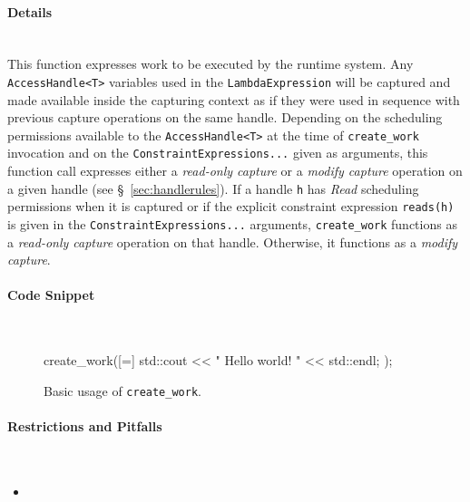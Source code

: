 \paragraph{Details}\mbox{}\\
This function expresses work to be executed by the runtime system.  Any
\texttt{AccessHandle<T>} variables used in the \texttt{LambdaExpression} will be
captured and made available inside the capturing context as if they were used in
sequence with previous capture operations on the same handle.  Depending on the
scheduling permissions available to the \texttt{AccessHandle<T>} at the time of
\texttt{create\_work} invocation and on the \texttt{ConstraintExpressions...}
given as arguments, this function call expresses either a {\it read-only
capture} or a {\it modify capture} operation on a given handle (see
\S~\ref{sec:handlerules}).  If a handle \texttt{h} has {\it Read} scheduling
permissions when it is captured or if the explicit constraint expression
\texttt{reads(h)} is given in the \texttt{ConstraintExpressions...} arguments,
\texttt{create\_work} functions as a {\it read-only capture} operation on that handle.
Otherwise, it functions as a {\it modify capture}.  


\paragraph{Code Snippet}\mbox{}\\
\begin{figure}[!h]
\begin{CppCodeNumb}
create_work([=]{
  std::cout << " Hello world! " << std::endl;
});
\end{CppCodeNumb}
\label{fig:fe_api_cw}
\caption{Basic usage of \texttt{create\_work}.}
\end{figure}


\paragraph{Restrictions and Pitfalls}\mbox{} \\
\begin{itemize}
  \item {}
\end{itemize}

